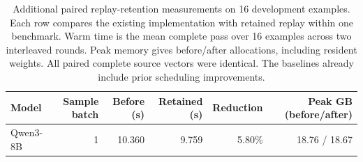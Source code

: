 \begin{table}[htbp]
\centering\small
\caption{Additional paired replay-retention measurements on 16 development examples. Each row compares the existing implementation with retained replay within one benchmark. Warm time is the mean complete pass over 16 examples across two interleaved rounds. Peak memory gives before/after allocations, including resident weights. All paired complete source vectors were identical. The baselines already include prior scheduling improvements.}
\label{tab:retention}
\begin{tabular}{@{}lrrrrr@{}}
\toprule
Model & Sample batch & Before (s) & Retained (s) & Reduction & Peak GB (before/after) \\
\midrule
Qwen3-8B & 1 & 10.360 & 9.759 & 5.80\% & 18.76 / 18.67 \\
\bottomrule
\end{tabular}
\end{table}
